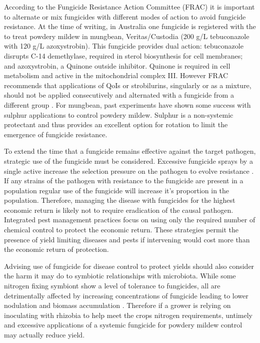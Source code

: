 \documentclass[agronomy,article,submit,moreauthors,pdftex]{mdpi}
\begin{document}
According to the Fungicide Resistance Action Committee (FRAC) it is
important to alternate or mix fungicides with different modes of action
to avoid fungicide resistance. At the time of writing, in Australia one
fungicide is registered with the to treat powdery mildew in mungbean,
Veritas/Custodia (200 g/L tebuconazole with 120 g/L azoxystrobin). This
fungicide provides dual action: tebuconazole disrupts C-14 demethylase,
required in sterol biosynthesis for cell membranes; and azoxystrobin, a
Quinone outside inhibitor. Quinone is required in cell metabolism and
active in the mitochondrial complex III. However FRAC recommends that
applications of QoIs or strobilurins, singularly or as a mixture, should
not be applied consecutively and alternated with a fungicide from a
different group \citep{Brent2007}. For mungbean, past experiments have
shown some success with sulphur applications to control powdery mildew.
Sulphur is a non-systemic protectant and thus provides an excellent
option for rotation to limit the emergence of fungicide resistance.

To extend the time that a fungicide remains effective against the target
pathogen, strategic use of the fungicide must be considered. Excessive
fungicide sprays by a single active increase the selection pressure on
the pathogen to evolve resistance \citep{Brent2007}. If any strains of
the pathogen with resistance to the fungicide are present in a
population regular use of the fungicide will increase it's proportion in
the population. Therefore, managing the disease with fungicides for the
highest economic return is likely not to require eradication of the
causal pathogen. Integrated pest management practices focus on using
only the required number of chemical control to protect the economic
return. These strategies permit the presence of yield limiting diseases
and pests if intervening would cost more than the economic return of
protection.

Advising use of fungicide for disease control to protect yields should
also consider the harm it may do to symbiotic relationships with
microbiota. While some nitrogen fixing symbiont show a level of
tolerance to fungicides, all are detrimentally affected by increasing
concentrations of fungicide leading to lower nodulation and biomass
accumulation \citep[\citet{Shahid2019}]{Ahemad2011}. Therefore if a
grower is relying on inoculating with rhizobia to help meet the crops
nitrogen requirements, untimely and excessive applications of a systemic
fungicide for powdery mildew control may actually reduce yield.
\end{document}
